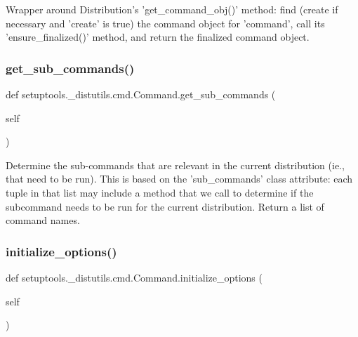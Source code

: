 \begin{DoxyVerb}Wrapper around Distribution's 'get_command_obj()' method: find
(create if necessary and 'create' is true) the command object for
'command', call its 'ensure_finalized()' method, and return the
finalized command object.
\end{DoxyVerb}
 \mbox{\label{classsetuptools_1_1__distutils_1_1cmd_1_1Command_a49e5b14e45c41ac8030b2c001cdf9736}} 
\subsubsection{\texorpdfstring{get\+\_\+sub\+\_\+commands()}{get\_sub\_commands()}}
{\footnotesize\ttfamily def setuptools.\+\_\+distutils.\+cmd.\+Command.\+get\+\_\+sub\+\_\+commands (\begin{DoxyParamCaption}\item[{}]{self }\end{DoxyParamCaption})}

\begin{DoxyVerb}Determine the sub-commands that are relevant in the current
distribution (ie., that need to be run).  This is based on the
'sub_commands' class attribute: each tuple in that list may include
a method that we call to determine if the subcommand needs to be
run for the current distribution.  Return a list of command names.
\end{DoxyVerb}
 \mbox{\label{classsetuptools_1_1__distutils_1_1cmd_1_1Command_abb96d70c357d435b22a1a9884337b1d4}} 
\subsubsection{\texorpdfstring{initialize\+\_\+options()}{initialize\_options()}}
{\footnotesize\ttfamily def setuptools.\+\_\+distutils.\+cmd.\+Command.\+initialize\+\_\+options (\begin{DoxyParamCaption}\item[{}]{self }\end{DoxyParamCaption})}

